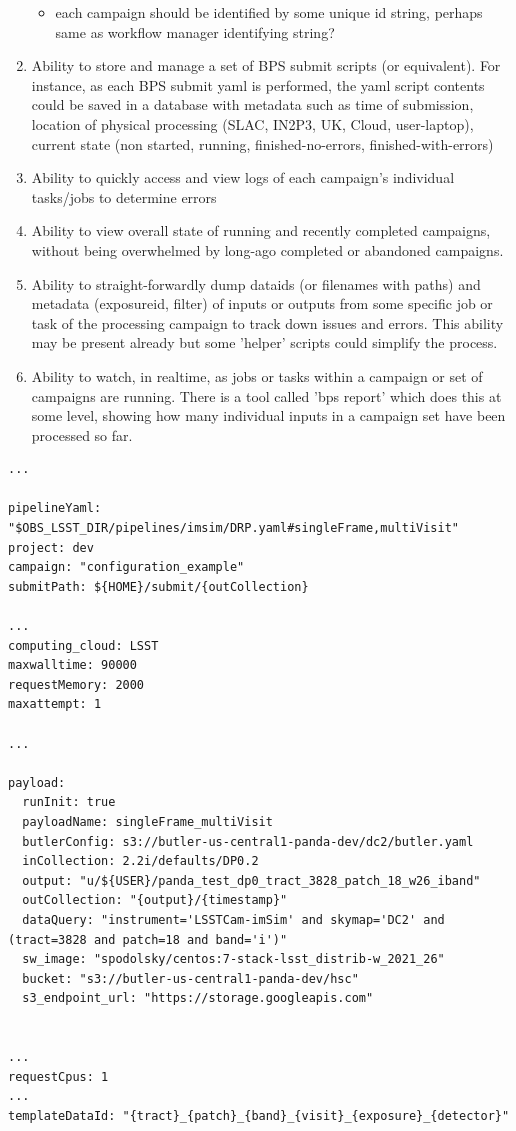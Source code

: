 \documentclass[DM,authoryear,toc]{lsstdoc}
\begin{document}
\begin{enumerate}
\begin{itemize}
	\item each campaign should be identified by some unique id string, 
	perhaps same as workflow manager identifying string?

	\end{itemize}

	\item Ability to store and manage a set of BPS submit scripts 
	(or equivalent).
	For instance, as each BPS submit yaml is performed, the yaml
	script contents could be saved in a database with metadata such
	as time of submission, location of physical processing
	(SLAC, IN2P3, UK, Cloud, user-laptop), current state (non started,
	running, finished-no-errors, finished-with-errors)


	\item Ability to quickly access and view logs of each 
	campaign's individual tasks/jobs to determine errors

	\item Ability to view overall state of running and recently
	completed campaigns, without being overwhelmed by long-ago completed
	or abandoned campaigns.

	\item Ability to straight-forwardly dump dataids (or filenames
	with paths) and metadata (exposureid, filter) of inputs or outputs
	from some specific job or task of the processing campaign to
	track down issues and errors.  This ability may be present already
	but some 'helper' scripts could simplify the process.

	\item Ability to watch, in realtime, as jobs or tasks within
	a campaign or set of campaigns are running.  There is a tool	
	called 'bps report' which does this at some level, showing how
	many individual inputs in a campaign set have been processed
	so far.

	\end {enumerate}

\begin{verbatim}
...

pipelineYaml: "$OBS_LSST_DIR/pipelines/imsim/DRP.yaml#singleFrame,multiVisit"
project: dev
campaign: "configuration_example"
submitPath: ${HOME}/submit/{outCollection}

...
computing_cloud: LSST
maxwalltime: 90000
requestMemory: 2000
maxattempt: 1

...

payload:
  runInit: true
  payloadName: singleFrame_multiVisit
  butlerConfig: s3://butler-us-central1-panda-dev/dc2/butler.yaml
  inCollection: 2.2i/defaults/DP0.2
  output: "u/${USER}/panda_test_dp0_tract_3828_patch_18_w26_iband"
  outCollection: "{output}/{timestamp}"
  dataQuery: "instrument='LSSTCam-imSim' and skymap='DC2' and (tract=3828 and patch=18 and band='i')"
  sw_image: "spodolsky/centos:7-stack-lsst_distrib-w_2021_26"
  bucket: "s3://butler-us-central1-panda-dev/hsc"
  s3_endpoint_url: "https://storage.googleapis.com"


...
requestCpus: 1
...
templateDataId: "{tract}_{patch}_{band}_{visit}_{exposure}_{detector}"


\end{verbatim}
\end{document}
